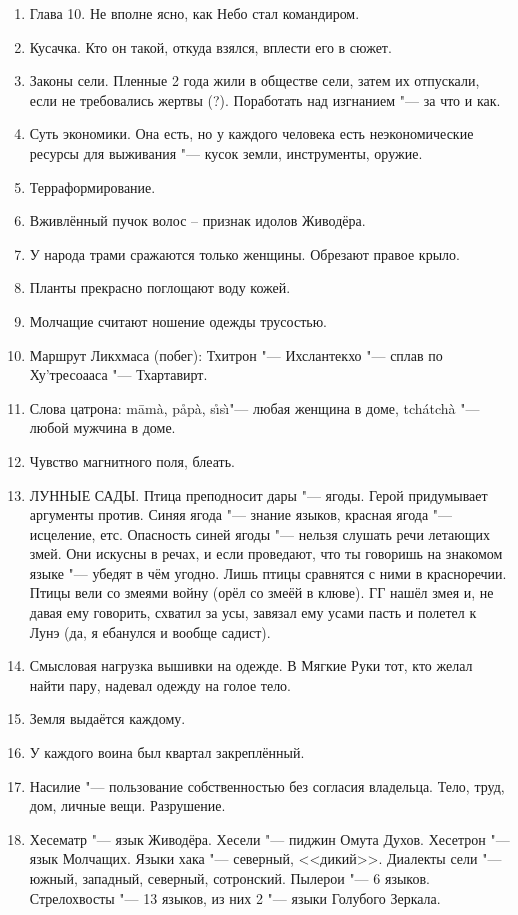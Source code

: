 \documentclass[a4paper,10pt]{book}
\begin{document}
\begin{enumerate}
\item Глава 10. Не вполне ясно, как Небо стал командиром.
\item Кусачка. Кто он такой, откуда взялся, вплести его в сюжет.
\item Законы сели. Пленные 2 года жили в обществе сели, затем их отпускали, 
если не требовались жертвы (?). Поработать над изгнанием "--- за что и как.
\item Суть экономики. Она есть, но у каждого человека есть неэкономические 
ресурсы для выживания "--- кусок земли, инструменты, оружие.
\item Терраформирование.
\item Вживлённый пучок волос -- признак идолов Живодёра.
\item У народа трами сражаются только женщины. Обрезают правое крыло.
\item Планты прекрасно поглощают воду кожей.
\item Молчащие считают ношение одежды трусостью.
\item Маршрут Ликхмаса (побег): Тхитрон "--- Ихслантекхо "--- сплав по 
Ху'тресоааса "--- Тхартавирт.
\item 
Слова цатрона: m\=am\`a, p\r{a}p\`a, s\r{\i}s\`\i "--- любая женщина в доме, 
tch\'atch\`a "--- любой мужчина в доме.
\item Чувство магнитного поля, блеать.
\item ЛУННЫЕ САДЫ. Птица преподносит дары "--- ягоды. Герой придумывает 
аргументы против. Синяя ягода "--- знание языков, красная ягода "--- исцеление, 
етс. Опасность синей ягоды "--- нельзя слушать речи летающих змей. Они искусны 
в речах, и если проведают, что ты говоришь на знакомом языке "--- убедят в чём 
угодно. Лишь птицы сравнятся с ними в красноречии. Птицы вели со змеями войну 
(орёл со змеёй в клюве). ГГ нашёл змея и, не давая ему говорить, схватил за 
усы, завязал ему усами пасть и полетел к Лунэ (да, я ебанулся и вообще садист).
\item Смысловая нагрузка вышивки на одежде. В Мягкие Руки тот, кто желал найти 
пару, надевал одежду на голое тело.
\item Земля выдаётся каждому.
\item У каждого воина был квартал закреплённый.
\item Насилие "--- пользование собственностью без согласия владельца. Тело, 
труд, дом, личные вещи. Разрушение.
\item Хесематр "--- язык Живодёра.
Хесели "--- пиджин Омута Духов.
Хесетрон "--- язык Молчащих.
Языки хака "--- северный, <<дикий>>.
Диалекты сели "--- южный, западный, северный, сотронский.
Пылерои "--- 6 языков. Стрелохвосты "--- 13 языков, из них 2 "--- языки 
Голубого 
Зеркала.
\end{enumerate}
\end{document}
